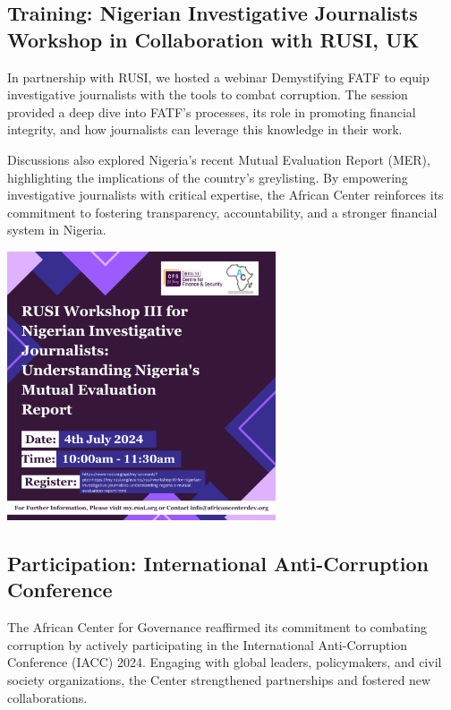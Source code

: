 \documentclass[
  letterpaper,
  DIV=11,
  numbers=noendperiod]{scrreprt}
\begin{document}
\subsection{Training: Nigerian Investigative Journalists Workshop in
Collaboration with RUSI,
UK}\label{training-nigerian-investigative-journalists-workshop-in-collaboration-with-rusi-uk}

In partnership with RUSI, we hosted a webinar Demystifying FATF to equip
investigative journalists with the tools to combat corruption. The
session provided a deep dive into FATF's processes, its role in
promoting financial integrity, and how journalists can leverage this
knowledge in their work.

Discussions also explored Nigeria's recent Mutual Evaluation Report
(MER), highlighting the implications of the country's greylisting. By
empowering investigative journalists with critical expertise, the
African Center reinforces its commitment to fostering transparency,
accountability, and a stronger financial system in Nigeria.

\begin{center}
\includegraphics[width=3.125in,height=\textheight,keepaspectratio]{images/strengthen/07_rusi.png}
\end{center}

\subsection{Participation: International Anti-Corruption
Conference}\label{participation-international-anti-corruption-conference}

The African Center for Governance reaffirmed its commitment to combating
corruption by actively participating in the International
Anti-Corruption Conference (IACC) 2024. Engaging with global leaders,
policymakers, and civil society organizations, the Center strengthened
partnerships and fostered new collaborations.
\end{document}
